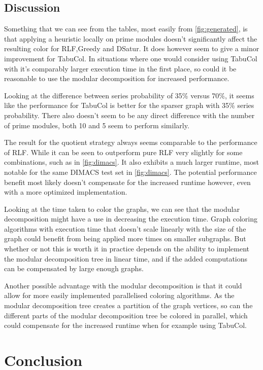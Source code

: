 \documentclass[a4paper]{article}
\begin{document}
\FloatBarrier
\subsection{Discussion}

Something that we can see from the tables, most easily from
\autoref{fig:generated}, is that applying a heuristic locally on prime modules
doesn't significantly affect the resulting color for RLF,Greedy and DSatur. It
does however seem to give a minor improvement for TabuCol. In situations where
one would consider using TabuCol with it's comparably larger execution time in
the first place, so could it be reasonable to use the modular decomposition for
increased performance.

Looking at the difference between series probability of 35\% versus 70\%, it
seems like the performance for TabuCol is better for the sparser graph with
35\% series probability. There also doesn't seem to be any direct difference
with the number of prime modules, both 10 and 5 seem to perform similarly.

The result for the quotient strategy always seems comparable to the performance
of RLF. While it can be seen to outperform pure RLF very slightly for some
combinations, such as in \autoref{fig:dimacs}. It also exhibits a much larger
runtime, most notable for the same DIMACS test set in \autoref{fig:dimacs}.  The
potential performance benefit most likely doesn't compensate for the increased
runtime however, even with a more optimized implementation.

Looking at the time taken to color the graphs, we can see that the modular
decomposition might have a use in decreasing the execution time. Graph coloring
algorithms with execution time that doesn't scale linearly with the size of the
graph could benefit from being applied more times on smaller subgraphs. But
whether or not this is worth it in practice depends on the ability to implement
the modular decomposition tree in linear time, and if the added computations
can be compensated by large enough graphs.

Another possible advantage with the modular decomposition is that it could
allow for more easily implemented parallelised coloring algorithms. As the
modular decomposition tree creates a partition of the graph vertices, so can
the different parts of the modular decomposition tree be colored in parallel,
which could compensate for the increased runtime when for example using TabuCol.

\section{Conclusion}
\end{document}
